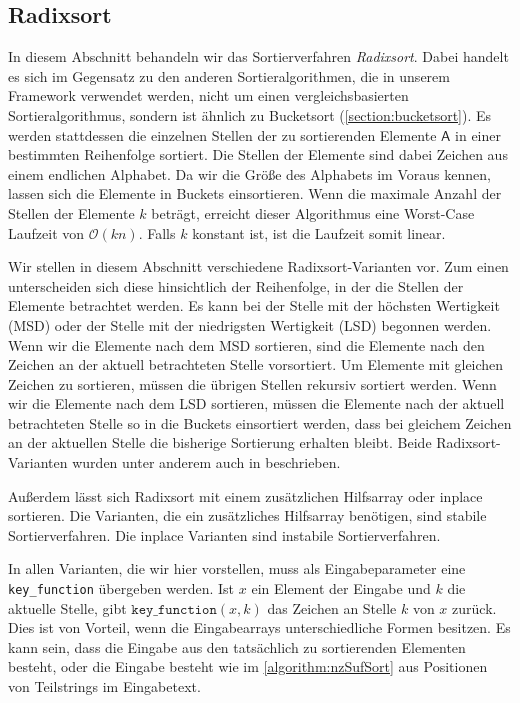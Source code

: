 \subsection{Radixsort}
\label{sort:radix}

In  diesem Abschnitt behandeln wir das Sortierverfahren \emph{Radixsort}.
Dabei handelt es sich im Gegensatz zu den anderen Sortieralgorithmen, die in unserem Framework verwendet werden,
nicht um einen vergleichsbasierten Sortieralgorithmus, sondern ist ähnlich zu Bucketsort (\cref{section:bucketsort}).
Es werden stattdessen die einzelnen Stellen der zu sortierenden Elemente $\mathsf{A}$ in einer bestimmten Reihenfolge sortiert.
Die Stellen der Elemente sind dabei Zeichen aus einem endlichen Alphabet.
Da wir die Größe des Alphabets im Voraus kennen, lassen sich die Elemente in Buckets einsortieren.
Wenn die maximale Anzahl der Stellen der Elemente $k$ beträgt,
erreicht dieser Algorithmus eine Worst-Case Laufzeit von $\mathcal O(kn)$.
Falls $k$ konstant ist, ist die Laufzeit somit linear.

Wir stellen in diesem Abschnitt verschiedene Radixsort-Varianten vor.
Zum einen unterscheiden sich diese hinsichtlich der Reihenfolge,
in der die Stellen der Elemente betrachtet werden.
Es kann bei der Stelle mit der höchsten Wertigkeit (MSD) oder der Stelle mit der niedrigsten Wertigkeit (LSD) begonnen werden.
Wenn wir die Elemente nach dem MSD sortieren, sind die Elemente nach den Zeichen an der aktuell betrachteten Stelle vorsortiert.
Um Elemente mit gleichen Zeichen zu sortieren, müssen die übrigen Stellen rekursiv sortiert werden.
Wenn wir die Elemente nach dem LSD sortieren,
müssen die Elemente nach der aktuell betrachteten Stelle so in die Buckets einsortiert werden,
dass bei gleichem Zeichen an der aktuellen Stelle die bisherige Sortierung erhalten bleibt.
Beide Radixsort-Varianten wurden unter anderem auch in \cite{Cormen2009} beschrieben.

Außerdem lässt sich Radixsort mit einem zusätzlichen Hilfsarray oder inplace sortieren.
Die Varianten, die ein zusätzliches Hilfsarray benötigen, sind stabile Sortierverfahren.
Die inplace Varianten sind instabile Sortierverfahren.

In allen Varianten, die wir hier vorstellen,
muss als Eingabeparameter eine \texttt{key\_function} übergeben werden.
Ist $x$ ein Element der Eingabe und $k$ die aktuelle Stelle, gibt $\texttt{key\_function}(x,k)$ das Zeichen an Stelle $k$ von $x$ zurück.
Dies ist von Vorteil, wenn die Eingabearrays unterschiedliche Formen besitzen.
Es kann sein, dass die Eingabe aus den tatsächlich zu sortierenden Elementen besteht,
oder die Eingabe besteht wie im \cref{algorithm:nzSufSort} aus Positionen von Teilstrings im Eingabetext.

